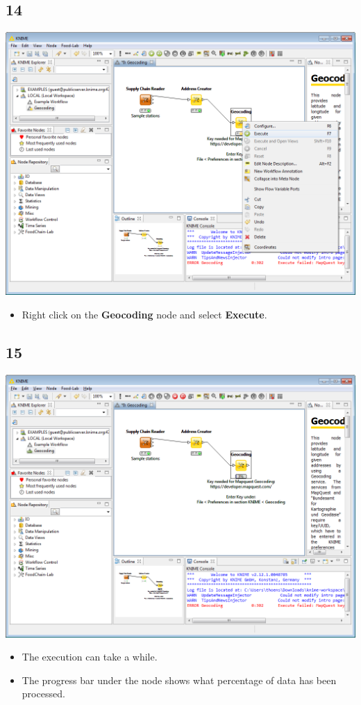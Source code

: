 \documentclass{beamer}
\begin{document}
\subsection{14}
\begin{frame}
	\begin{center}
  		\includegraphics[height=0.6\textheight]{14.png}
	\end{center}
	\begin{itemize}
		\item Right click on the \textbf{Geocoding} node and select \textbf{Execute}.
	\end{itemize}
\end{frame}

\subsection{15}
\begin{frame}
	\begin{center}
  		\includegraphics[height=0.6\textheight]{15.png}
	\end{center}
	\begin{itemize}
		\item The execution can take a while.
		\item The progress bar under the node shows what percentage of data has been processed.
	\end{itemize}
\end{frame}
\end{document}
